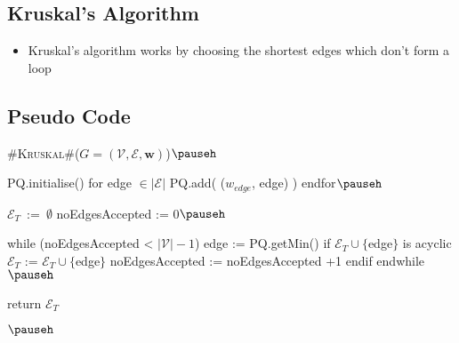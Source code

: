 \Outline %

\begin{slide}
\section[-2]{Kruskal's Algorithm}

\pausebuild
\color{TwoColor}
\begin{itemize}\squeeze
\item Kruskal's algorithm works by choosing the shortest edges which
  don't form a loop\pause
\end{itemize}
  \vspace*{-1cm}
  \begin{center}\color{TextColor}
    \pause
  \end{center}
  \vspace*{-1cm}
\end{slide}


\begin{slide}
\section[-1]{Pseudo Code}

\begin{pseudo}
#\textsc{Kruskal}#($G=(\mathcal{V},\mathcal{E}, \bm{w})$)$\pauseh$
{
   PQ.initialise()
   for edge  $\in |\mathcal{E}|$
      PQ.add( ($w_{edge}$, edge) )
   endfor$\pauseh$

   $\mathcal{E}_T\,$ := $\,\emptyset$
   noEdgesAccepted := 0$\pauseh$

   while (noEdgesAccepted < $|\mathcal{V}|-1$)
      edge := PQ.getMin()
      if $\mathcal{E}_T \cup \{$edge$\}$ is acyclic
         $\mathcal{E}_T$ := $\mathcal{E}_T \cup \{$edge$\}$
         noEdgesAccepted := noEdgesAccepted +1
      endif
   endwhile$\pauseh$

   return $\mathcal{E}_T$
}$\pauseh$
\end{pseudo}
\vspace*{-1cm}
\end{slide}


